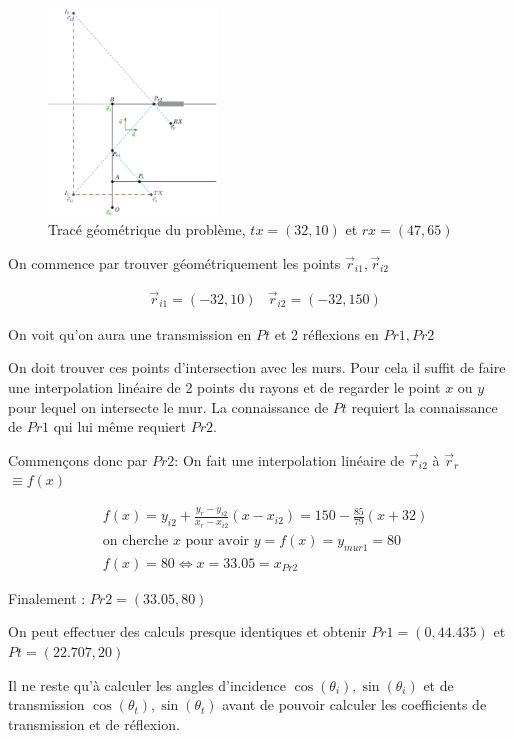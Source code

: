 \documentclass[sn-mathphys-num]{sn-jnl}
\begin{document}
\begin{figure}[H]
    \centering
    \includegraphics[width=0.4\textwidth]{images/verif/2_rebonds.png}
    \caption{Tracé géométrique du problème, $tx = (32, 10)$ et $rx = (47, 65)$}
    \label{f:exemple}
\end{figure}

On commence par trouver géométriquement les points $\vec{r}_{i1}, \vec{r}_{i2}$

\begin{align*}
    &\vec{r}_{i1} = (-32, 10) &\vec{r}_{i2} = (-32, 150)
\end{align*}

On voit qu'on aura une transmission en $Pt$ et 2 réflexions en $Pr1, Pr2$

On doit trouver ces points d'intersection avec les murs.
Pour cela il suffit de faire une interpolation linéaire de 2 points du rayons
et de regarder le point $x$ ou $y$ pour lequel on intersecte le mur.
La connaissance de $Pt$ requiert la connaissance de $Pr1$ qui lui même requiert $Pr2$.

Commençons donc par $Pr2$:
On fait une interpolation linéaire de $\vec{r}_{i2}$ à $\vec{r}_{r}$ $\equiv f(x)$

\begin{align*}
    &f(x) = y_{i2} + \frac{y_r - y_{i2}}{x_r - x_{i2}}(x - x_{i2})
    = 150 - \frac{85}{79}(x + 32)\\
    &\textrm{on cherche $x$ pour avoir $y=f(x)=y_{mur1}=80$}\\
    &f(x) = 80 \iff x = 33.05 = x_{Pr2}
\end{align*}

Finalement : $Pr2 = (33.05, 80)$

On peut effectuer des calculs presque identiques et obtenir $Pr1 = (0, 44.435)$ et $Pt = (22.707, 20)$

Il ne reste qu'à calculer les angles d'incidence $\cos(\theta_i), \sin(\theta_i)$ 
et de transmission $\cos(\theta_t), \sin(\theta_t)$
avant de pouvoir calculer les coefficients de transmission et de réflexion.
\end{document}
